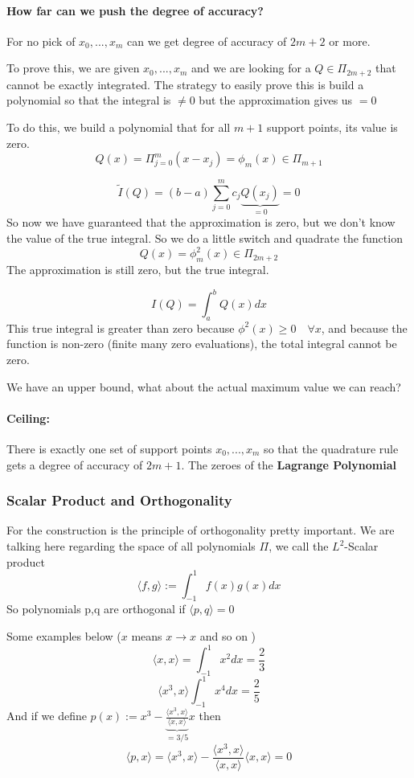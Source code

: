 \documentclass{article}
\begin{document}
\paragraph{How far can we push the degree of accuracy?} For no pick of $x_0,...,x_m$ can we get degree of accuracy of $2m+2$ or more.

To prove this, we are given $x_0,...,x_m$ and we are looking for a $Q\in \Pi_{2m+2}$ that cannot be exactly integrated. The strategy to easily prove this is build a polynomial so that the integral is $\neq 0$ but the approximation gives us $=0$

To do this, we build a polynomial that for all $m+1$ support points, its value is zero.
\[Q(x) =  \Pi_{j=0}^m(x-x_j) = \phi_m(x) \in \Pi_{m+1}\]

\[\tilde{I}(Q) = (b-a)\sum_{j=0}^mc_j\underbrace{Q(x_j)}_{=0} = 0\]
So now we have guaranteed that the approximation is zero, but we don't know the value of the true integral. So we do a little switch and quadrate the function
\[Q(x) = \phi_m^2(x) \in \Pi_{2m+2}\]
The approximation is still zero, but the true integral.

\[I(Q) = \int_a^b Q(x)dx\]
This true integral is greater than zero because $\phi^2(x) \geq 0 \quad \forall x$, and because the function is non-zero (finite many zero evaluations), the total integral cannot be zero.

We have an upper bound, what about the actual maximum value we can reach? 
\paragraph{Ceiling: } There is exactly one set of support points $x_0,...,x_m$ so that the quadrature rule gets a degree of accuracy of $2m+1$. The zeroes of the \textbf{Lagrange Polynomial}

\subsubsection{Scalar Product and Orthogonality}
\label{subsubsec:scalar_prod_orthogonality}
For the construction is the principle of orthogonality pretty important. We are talking here regarding the space of all polynomials $\Pi$, we call the $L^2$-Scalar product
\[\langle f,g \rangle := \int_{-1}^1 f(x)g(x)dx\]
So polynomials p,q are orthogonal if $\langle p,q \rangle = 0$

Some examples below ($x$ means $x\to x$ and so on )
\[\langle x,x \rangle = \int_{-1}^1 x^2 dx = \frac{2}{3}\]
\[\langle x^3, x \rangle \int_{-1}^1 x^4 dx = \frac{2}{5}\]
And if we define $p(x) := x^3 - \underbrace{\frac{\langle x^3 , x\rangle}{\langle x,x \rangle}}_{=3/5}x$ then
\[\langle p , x \rangle = \langle x^3, x\rangle - \frac{\langle x^3 , x \rangle}{\langle x,x \rangle} \langle x,x \rangle = 0\]
\end{document}
